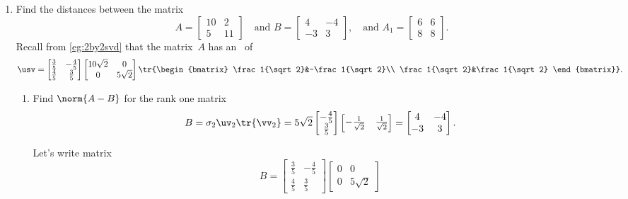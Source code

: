 \begin{example}
\begin{enumerate}
\item Find the distances between the matrix
\begin{equation*}
A=\begin{bmatrix} 10&2\\5&11 \end{bmatrix}
\quad\text{and }B=\begin{bmatrix} 4&-4\\-3&3 \end{bmatrix},
\quad\text{and } A_1=\begin{bmatrix} 6&6\\8&8 \end{bmatrix}.
\end{equation*}
Recall from \cref{eg:2by2svd} that the matrix~\(A\) has an \svd\ of
\begin{equation*}
\usv=\begin{bmatrix} \frac35&-\frac45\\\frac45&\frac35 \end{bmatrix}
\begin{bmatrix} 10\sqrt2&0\\0&5\sqrt2 \end{bmatrix}
\tr{\begin{bmatrix} \frac1{\sqrt2}&-\frac1{\sqrt2}\\ \frac1{\sqrt2}&\frac1{\sqrt2} \end{bmatrix}}.
\end{equation*}
\begin{enumerate}
\item Find \(\norm{A-B}\) for the rank one matrix 
\begin{equation*}
B=\sigma_2\uv_2\tr{\vv_2}
=5\sqrt2\begin{bmatrix} -\frac45\\\frac35 \end{bmatrix}
\begin{bmatrix} -\frac1{\sqrt2}&\frac1{\sqrt2} \end{bmatrix}
=\begin{bmatrix} 4&-4\\-3&3 \end{bmatrix}.
\end{equation*}
\begin{solution} 
Let's write matrix
\begin{equation*}
B=\begin{bmatrix} \frac35&-\frac45\\\frac45&\frac35 \end{bmatrix}
\begin{bmatrix} 0&0\\0&5\sqrt2 \end{bmatrix}

\end{equation*}
\end{solution}
\end{enumerate}
\end{enumerate}
\end{example}

